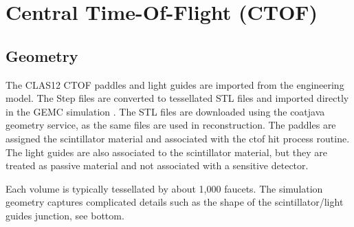 \section{Central Time-Of-Flight (CTOF)}

\subsection{Geometry}

The CLAS12 CTOF paddles and light guides are imported from the engineering model. The Step files are converted to tessellated STL files and imported
directly in the GEMC simulation \cite{gemcCad}. The STL files are downloaded using the coatjava geometry service, as the same files are used in reconstruction.
The paddles are assigned the scintillator material and associated with the ctof hit process routine.
The light guides are also associated to the scintillator material, but they are treated as passive material and not associated with a sensitive detector.

Each volume is typically tessellated by about 1,000 faucets. The simulation geometry captures complicated details such as the shape of the scintillator/light guides
junction, see  bottom.

